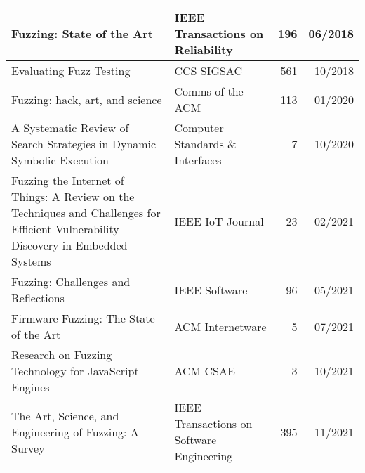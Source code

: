 \documentclass{article}
\begin{document}
\begin{longtable}{|P{0.44\textwidth}|P{0.32\textwidth}|r|r|}
    Fuzzing: State of the Art\cite{FuzzingStateOfTheArt2018}                                                                                      & IEEE Transactions on Reliability                           & 196            & 06/2018       \\\hline
    Evaluating Fuzz Testing\cite{EvaluatingFuzzTesting}                                                                                           & CCS SIGSAC                                                 & 561            & 10/2018       \\\hline
    Fuzzing: hack, art, and science\cite{HackArtScience}                                                                                          & Comms of the ACM                                           & 113            & 01/2020       \\\hline
    A Systematic Review of Search Strategies in Dynamic Symbolic Execution\cite{SearchStrategies}                                                 & Computer Standards \& Interfaces                           & 7              & 10/2020       \\\hline
    Fuzzing the Internet of Things: A Review on the Techniques and Challenges for Efficient Vulnerability Discovery in Embedded Systems\cite{IoT} & IEEE IoT Journal                                           & 23             & 02/2021       \\\hline
    Fuzzing: Challenges and Reflections\cite{ChallengesAndReflections}                                                                            & IEEE Software                                              & 96             & 05/2021       \\\hline
    Firmware Fuzzing: The State of the Art\cite{Firmware}                                                                                         & ACM Internetware                                           & 5              & 07/2021       \\\hline
    Research on Fuzzing Technology for JavaScript Engines\cite{JavaScript}                                                                        & ACM CSAE                                                   & 3              & 10/2021       \\\hline
    The Art, Science, and Engineering of Fuzzing: A Survey\cite{ArtScienceEngineeringFuzzing}                                                     & IEEE Transactions on Software Engineering                  & 395            & 11/2021       \\\hline

\end{longtable}
\end{document}
